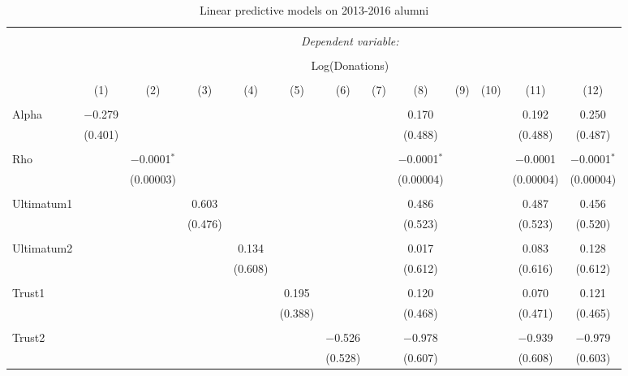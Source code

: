\newpage

\begin{table}[H] \centering 
  \caption{Linear predictive models on 2013-2016 alumni} 
  \label{} 
  \begin{adjustbox}{width=\textwidth}
  \begin{tabular}{@{\extracolsep{5pt}}lcccccccccccc} 
\\[-1.8ex]\hline 
\hline \\[-1.8ex] 
 & \multicolumn{12}{c}{\textit{Dependent variable:}} \\ 
\cline{2-13} 
\\[-1.8ex] & \multicolumn{12}{c}{Log(Donations)} \\ 
\\[-1.8ex] & (1) & (2) & (3) & (4) & (5) & (6) & (7) & (8) & (9) & (10) & (11) & (12)\\ 
\hline \\[-1.8ex] 
 Alpha & $-$0.279 &  &  &  &  &  &  & 0.170 &  &  & 0.192 & 0.250 \\ 
  & (0.401) &  &  &  &  &  &  & (0.488) &  &  & (0.488) & (0.487) \\ 
  & & & & & & & & & & & & \\ 
 Rho &  & $-$0.0001$^{*}$ &  &  &  &  &  & $-$0.0001$^{*}$ &  &  & $-$0.0001 & $-$0.0001$^{*}$ \\ 
  &  & (0.00003) &  &  &  &  &  & (0.00004) &  &  & (0.00004) & (0.00004) \\ 
  & & & & & & & & & & & & \\ 
 Ultimatum1 &  &  & 0.603 &  &  &  &  & 0.486 &  &  & 0.487 & 0.456 \\ 
  &  &  & (0.476) &  &  &  &  & (0.523) &  &  & (0.523) & (0.520) \\ 
  & & & & & & & & & & & & \\ 
 Ultimatum2 &  &  &  & 0.134 &  &  &  & 0.017 &  &  & 0.083 & 0.128 \\ 
  &  &  &  & (0.608) &  &  &  & (0.612) &  &  & (0.616) & (0.612) \\ 
  & & & & & & & & & & & & \\ 
 Trust1 &  &  &  &  & 0.195 &  &  & 0.120 &  &  & 0.070 & 0.121 \\ 
  &  &  &  &  & (0.388) &  &  & (0.468) &  &  & (0.471) & (0.465) \\ 
  & & & & & & & & & & & & \\ 
 Trust2 &  &  &  &  &  & $-$0.526 &  & $-$0.978 &  &  & $-$0.939 & $-$0.979 \\ 
  &  &  &  &  &  & (0.528) &  & (0.607) &  &  & (0.608) & (0.603) \\ 

\end{tabular}
\end{adjustbox}
\end{table}

